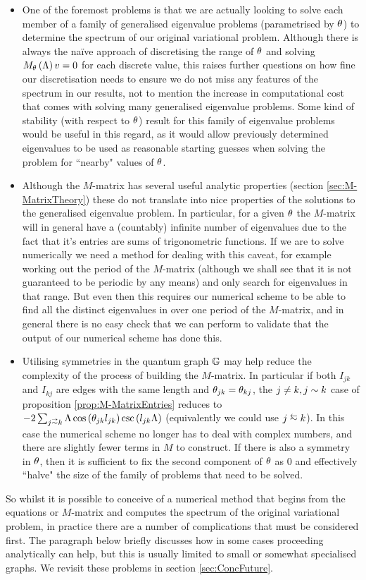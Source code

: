 \begin{itemize}
	\item One of the foremost problems is that we are actually looking to solve each member of a family of generalised eigenvalue problems (parametrised by $\theta$) to determine the spectrum of our original variational problem.
	Although there is always the na\"ive approach of discretising the range of $\theta$ and solving $M_{\theta}\left( \Lambda \right)v=0$ for each discrete value, this raises further questions on how fine our discretisation needs to ensure we do not miss any features of the spectrum in our results, not to mention the increase in computational cost that comes with solving many generalised eigenvalue problems.
	Some kind of stability (with respect to $\theta$) result for this family of eigenvalue problems would be useful in this regard, as it would allow previously determined eigenvalues to be used as reasonable starting guesses when solving the problem for ``nearby" values of $\theta$.
	\item Although the $M$-matrix has several useful analytic properties (section \ref{sec:M-MatrixTheory}) these do not translate into nice properties of the solutions to the generalised eigenvalue problem.
	In particular, for a given $\theta$ the $M$-matrix will in general have a (countably) infinite number of eigenvalues due to the fact that it's entries are sums of trigonometric functions.
	If we are to solve numerically we need a method for dealing with this caveat, for example working out the period of the $M$-matrix (although we shall see that it is not guaranteed to be periodic by any means) and only search for eigenvalues in that range.
	But even then this requires our numerical scheme to be able to find all the distinct eigenvalues in over one period of the $M$-matrix, and in general there is no easy check that we can perform to validate that the output of our numerical scheme has done this.
	\item Utilising symmetries in the quantum graph $\mathbb{G}$ may help reduce the complexity of the process of building the $M$-matrix.
	In particular if both $I_{jk}$ and $I_{kj}$ are edges with the same length and $\theta_{jk}=\theta_{kj}$, the $j\neq k, j\sim k$ case of proposition \ref{prop:M-MatrixEntries} reduces to $-2\sum_{j\conLeft k}\effFreq\cos\bracs{\qm_{jk}l_{jk}}\csc\bracs{l_{jk}\effFreq}$ (equivalently we could use $j\conRight k$).
	In this case the numerical scheme no longer has to deal with complex numbers, and there are slightly fewer terms in $M$ to construct.
	If there is also a symmetry in $\theta$, then it is sufficient to fix the second component of $\theta$ as 0 and effectively ``halve" the size of the family of problems that need to be solved.
\end{itemize}
So whilst it is possible to conceive of a numerical method that begins from the equations or $M$-matrix and computes the spectrum of the original variational problem, in practice there are a number of complications that must be considered first.
The paragraph below briefly discusses how in some cases proceeding analytically can help, but this is usually limited to small or somewhat specialised graphs.
We revisit these problems in section \ref{sec:ConcFuture}. \newline

